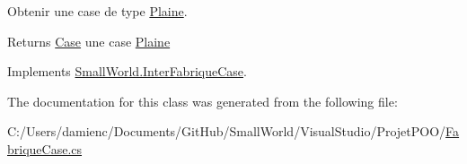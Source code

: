 Obtenir une case de type \hyperlink{class_small_world_1_1_plaine}{Plaine}. 

\begin{DoxyReturn}{Returns}
\hyperlink{class_small_world_1_1_case}{Case} une case \hyperlink{class_small_world_1_1_plaine}{Plaine} 
\end{DoxyReturn}


Implements \hyperlink{interface_small_world_1_1_inter_fabrique_case_afccc307065f7d06dc99fc268604798c7}{Small\-World.\-Inter\-Fabrique\-Case}.



The documentation for this class was generated from the following file\-:\begin{DoxyCompactItemize}
\item 
C\-:/\-Users/damienc/\-Documents/\-Git\-Hub/\-Small\-World/\-Visual\-Studio/\-Projet\-P\-O\-O/\hyperlink{_fabrique_case_8cs}{Fabrique\-Case.\-cs}\end{DoxyCompactItemize}
